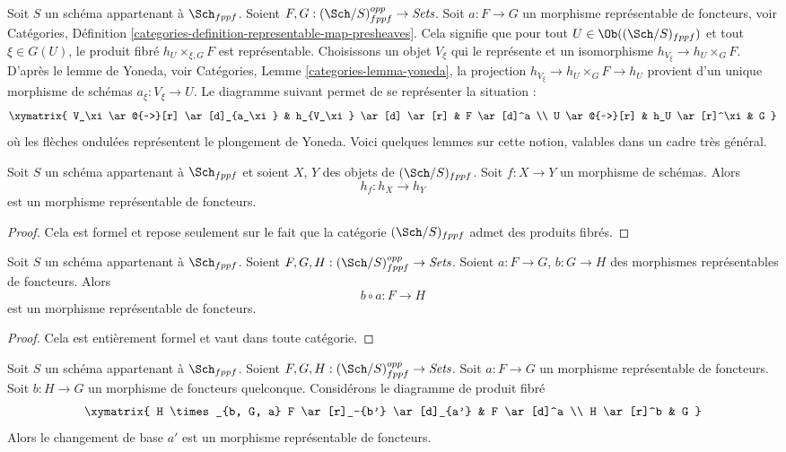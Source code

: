 \noindent
Soit $S$ un schéma appartenant à $\Sch_{fppf}$.
Soient $F, G : (\Sch/S)_{fppf}^{opp} \to \textit{Sets}$.
Soit $a : F \to G$ un morphisme représentable de foncteurs, voir
Catégories,
Définition \ref{categories-definition-representable-map-presheaves}.
Cela signifie que pour tout
$U \in \Ob((\Sch/S)_{fppf})$
et tout $\xi \in G(U)$, le produit fibré $h_U \times_{\xi, G} F$ est représentable.
Choisissons un objet $V_\xi$ qui le représente et un isomorphisme
$h_{V_\xi} \to h_U \times_G F$.
D'après le lemme de Yoneda, voir Catégories, Lemme \ref{categories-lemma-yoneda},
la projection $h_{V_\xi} \to h_U \times_G F \to h_U$ provient d'un unique
morphisme de schémas $a_\xi : V_\xi \to U$.
Le diagramme suivant permet de se représenter la situation :
$$
\xymatrix{
V_\xi \ar@{~>}[r] \ar[d]_{a_\xi} & h_{V_\xi} \ar[d] \ar[r] & F \ar[d]^a \\
U \ar@{~>}[r] & h_U \ar[r]^\xi & G
}
$$
où les flèches ondulées représentent le plongement de Yoneda.
Voici quelques lemmes sur cette notion, valables dans un cadre très général.

\begin{lemma}
\label{lemma-morphism-schemes-gives-representable-transformation}
Soit $S$ un schéma appartenant à $\Sch_{fppf}$ et soient
$X$, $Y$ des objets de $(\Sch/S)_{fppf}$.
Soit $f : X \to Y$ un morphisme de schémas.
Alors
$$
h_f : h_X \longrightarrow h_Y
$$
est un morphisme représentable de foncteurs.
\end{lemma}

\begin{proof}
Cela est formel et repose seulement sur le fait que
la catégorie $(\Sch/S)_{fppf}$ admet des produits fibrés.
\end{proof}

\begin{lemma}
\label{lemma-composition-representable-transformations}
Soit $S$ un schéma appartenant à $\Sch_{fppf}$.
Soient $F, G, H : (\Sch/S)_{fppf}^{opp} \to \textit{Sets}$.
Soient $a : F \to G$, $b : G \to H$ des morphismes représentables de foncteurs.
Alors
$$
b \circ a : F \longrightarrow H
$$
est un morphisme représentable de foncteurs.
\end{lemma}

\begin{proof}
Cela est entièrement formel et vaut dans toute catégorie.
\end{proof}

\begin{lemma}
\label{lemma-base-change-representable-transformations}
Soit $S$ un schéma appartenant à $\Sch_{fppf}$.
Soient $F, G, H : (\Sch/S)_{fppf}^{opp} \to \textit{Sets}$.
Soit $a : F \to G$ un morphisme représentable de foncteurs.
Soit $b : H \to G$ un morphisme de foncteurs quelconque.
Considérons le diagramme de produit fibré
$$
\xymatrix{
H \times_{b, G, a} F \ar[r]_-{b'} \ar[d]_{a'} & F \ar[d]^a \\
H \ar[r]^b & G
}
$$
Alors le changement de base $a'$ est un morphisme représentable de foncteurs.
\end{lemma}

